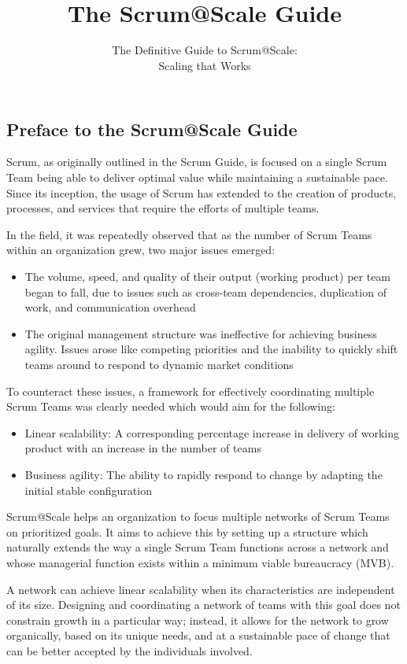 \documentclass[12pt,a4paper,parskip=full]{scrartcl}
\title{\Huge{\color{red}\textbf{The Scrum@Scale 
\textsuperscript{\registered} 
Guide}}}
\subtitle{\color{gray}The Definitive Guide to Scrum@Scale:\\ Scaling that Works}
\date{}
\begin{document}
\tableofcontents

\subsection{Preface to the Scrum@Scale
Guide}\label{preface-to-the-ScrumatScale-guide}

Scrum, as originally outlined in the Scrum Guide, is focused on a single Scrum Team being able to deliver optimal value while maintaining a sustainable pace. Since its inception, the usage of Scrum has extended to the creation of products, processes, and services that require the efforts of multiple teams. 

In the field, it was repeatedly observed that as the number of Scrum Teams within an organization grew, two major issues emerged:


\begin{itemize}%
\itemsep10pt
\item
  The volume, speed, and quality of their output (working product) per team began to fall, due to issues such as cross-team dependencies, duplication of work, and communication overhead 
\item
 The original management structure was ineffective for achieving business agility. Issues arose like competing priorities and the inability to quickly shift teams around to respond to dynamic market conditions
\end{itemize}

To counteract these issues, a framework for effectively coordinating multiple Scrum Teams was clearly needed which would aim for the following:

\begin{itemize}
\itemsep10pt
\item
  Linear scalability: A corresponding percentage increase in delivery of working product with an increase in the number of teams
\item
 Business agility: The ability to rapidly respond to change by adapting the initial stable configuration
\end{itemize}

Scrum@Scale helps an organization to focus multiple networks of Scrum Teams on prioritized goals. It aims to achieve this by setting up a structure which naturally extends the way a single Scrum Team functions across a network and whose managerial function exists within a minimum viable bureaucracy (MVB).


A network can achieve linear scalability when its characteristics are independent of its size. Designing and coordinating a network of teams with this goal does not constrain growth in a particular way; instead, it allows for the network to grow organically, based on its unique needs, and at a sustainable pace of change that can be better accepted by the individuals involved. 
\end{document}
